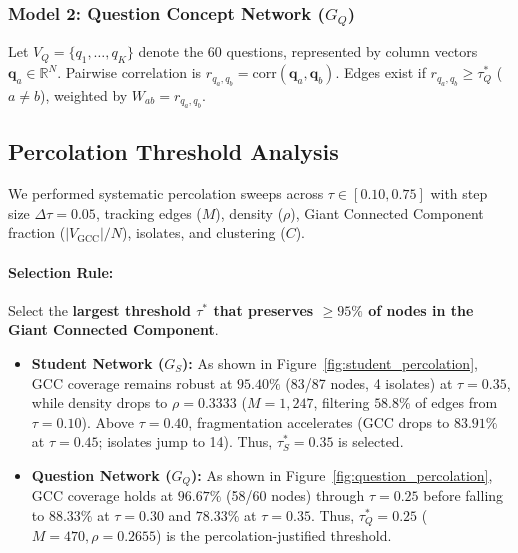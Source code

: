 \documentclass[10pt,twocolumn,a4paper]{article}
\begin{document}
\subsubsection{\texorpdfstring{Model 2: Question Concept Network ($G_Q$)}{Model 2: Question Concept Network (G\_Q)}}
Let $V_Q = \{q_1, \dots, q_K\}$ denote the 60 questions, represented by column vectors $\mathbf{q}_a \in \mathbb{R}^N$. Pairwise correlation is $r_{q_a, q_b} = \text{corr}(\mathbf{q}_a, \mathbf{q}_b)$. Edges exist if $r_{q_a, q_b} \ge \tau^*_Q$ ($a \ne b$), weighted by $W_{ab} = r_{q_a, q_b}$.

\subsection{Percolation Threshold Analysis}
We performed systematic percolation sweeps across $\tau \in [0.10, 0.75]$ with step size $\Delta \tau = 0.05$, tracking edges ($M$), density ($\rho$), Giant Connected Component fraction ($|V_{\text{GCC}}| / N$), isolates, and clustering ($C$).

\paragraph{Selection Rule:} Select the \textbf{largest threshold $\tau^*$ that preserves $\ge 95\%$ of nodes in the Giant Connected Component}.
\begin{itemize}[noitemsep,topsep=1pt,leftmargin=1.2em]
    \item \textbf{Student Network ($G_S$):} As shown in Figure~\ref{fig:student_percolation}, GCC coverage remains robust at $95.40\%$ (83/87 nodes, 4 isolates) at $\tau = 0.35$, while density drops to $\rho = 0.3333$ ($M = 1,247$, filtering $58.8\%$ of edges from $\tau = 0.10$). Above $\tau = 0.40$, fragmentation accelerates (GCC drops to $83.91\%$ at $\tau = 0.45$; isolates jump to 14). Thus, \textbf{$\tau^*_S = 0.35$} is selected.
    \item \textbf{Question Network ($G_Q$):} As shown in Figure~\ref{fig:question_percolation}, GCC coverage holds at $96.67\%$ (58/60 nodes) through $\tau = 0.25$ before falling to $88.33\%$ at $\tau = 0.30$ and $78.33\%$ at $\tau = 0.35$. Thus, \textbf{$\tau^*_Q = 0.25$} ($M = 470, \rho = 0.2655$) is the percolation-justified threshold.
\end{itemize}


\end{document}
